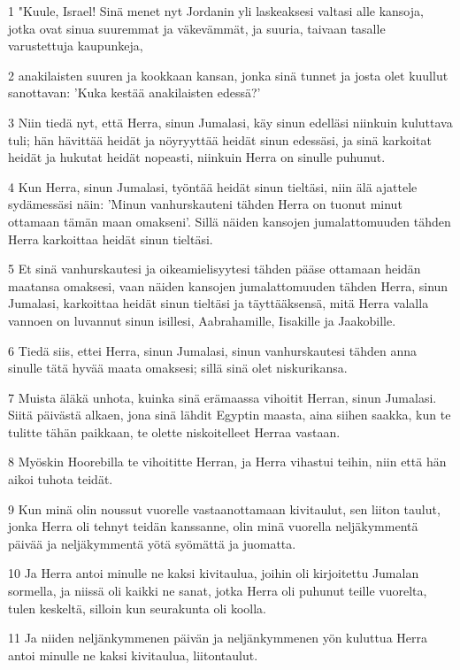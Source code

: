\par 1 "Kuule, Israel! Sinä menet nyt Jordanin yli laskeaksesi valtasi alle kansoja, jotka ovat sinua suuremmat ja väkevämmät, ja suuria, taivaan tasalle varustettuja kaupunkeja,
\par 2 anakilaisten suuren ja kookkaan kansan, jonka sinä tunnet ja josta olet kuullut sanottavan: 'Kuka kestää anakilaisten edessä?'
\par 3 Niin tiedä nyt, että Herra, sinun Jumalasi, käy sinun edelläsi niinkuin kuluttava tuli; hän hävittää heidät ja nöyryyttää heidät sinun edessäsi, ja sinä karkoitat heidät ja hukutat heidät nopeasti, niinkuin Herra on sinulle puhunut.
\par 4 Kun Herra, sinun Jumalasi, työntää heidät sinun tieltäsi, niin älä ajattele sydämessäsi näin: 'Minun vanhurskauteni tähden Herra on tuonut minut ottamaan tämän maan omakseni'. Sillä näiden kansojen jumalattomuuden tähden Herra karkoittaa heidät sinun tieltäsi.
\par 5 Et sinä vanhurskautesi ja oikeamielisyytesi tähden pääse ottamaan heidän maatansa omaksesi, vaan näiden kansojen jumalattomuuden tähden Herra, sinun Jumalasi, karkoittaa heidät sinun tieltäsi ja täyttääksensä, mitä Herra valalla vannoen on luvannut sinun isillesi, Aabrahamille, Iisakille ja Jaakobille.
\par 6 Tiedä siis, ettei Herra, sinun Jumalasi, sinun vanhurskautesi tähden anna sinulle tätä hyvää maata omaksesi; sillä sinä olet niskurikansa.
\par 7 Muista äläkä unhota, kuinka sinä erämaassa vihoitit Herran, sinun Jumalasi. Siitä päivästä alkaen, jona sinä lähdit Egyptin maasta, aina siihen saakka, kun te tulitte tähän paikkaan, te olette niskoitelleet Herraa vastaan.
\par 8 Myöskin Hoorebilla te vihoititte Herran, ja Herra vihastui teihin, niin että hän aikoi tuhota teidät.
\par 9 Kun minä olin noussut vuorelle vastaanottamaan kivitaulut, sen liiton taulut, jonka Herra oli tehnyt teidän kanssanne, olin minä vuorella neljäkymmentä päivää ja neljäkymmentä yötä syömättä ja juomatta.
\par 10 Ja Herra antoi minulle ne kaksi kivitaulua, joihin oli kirjoitettu Jumalan sormella, ja niissä oli kaikki ne sanat, jotka Herra oli puhunut teille vuorelta, tulen keskeltä, silloin kun seurakunta oli koolla.
\par 11 Ja niiden neljänkymmenen päivän ja neljänkymmenen yön kuluttua Herra antoi minulle ne kaksi kivitaulua, liitontaulut.
